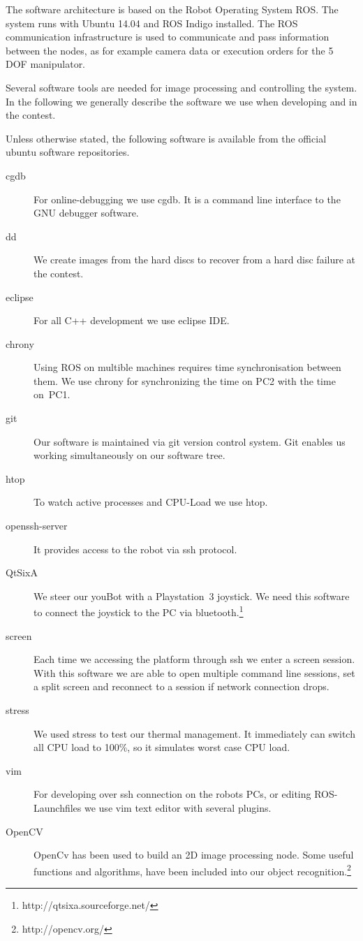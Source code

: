 The software architecture is based on the Robot Operating System ROS. The system runs with Ubuntu 14.04 and ROS Indigo installed. The ROS communication infrastructure is used to communicate and pass information between the nodes, as for example camera data or execution orders for the 5 DOF manipulator. 

Several software tools are needed for image processing and controlling the system. In the following we generally describe the software we use when developing and in the contest.

Unless otherwise stated, the following software is available from the official ubuntu software repositories.

\begin{description}
	\item [cgdb] For online-debugging we use cgdb. It is a command line interface to the GNU debugger software. 
	\item [dd] We create images from the hard discs to recover from a hard disc failure at the contest.
	\item [eclipse] For all C++ development we use eclipse IDE. 
	\item [chrony] Using ROS on multible machines requires time synchronisation between them. We use chrony for synchronizing the time on PC2 with the time on~PC1.
	\item [git] Our software is maintained via git version  control system. Git enables us working simultaneously on our software tree.  
	\item [htop] To watch active processes and CPU-Load we use htop. 
	\item [openssh-server] It provides access to the robot via ssh protocol. 
	\item [QtSixA] We steer our youBot with a Playstation~3 joystick. We need this software to connect the joystick to the PC via bluetooth.\footnote{http://qtsixa.sourceforge.net/}
	\item  [screen] Each time we accessing the platform through ssh we enter a screen session. With this software we are able to open multiple command line sessions, set a split screen and reconnect to a session if network connection drops. 
	\item [stress] We used stress to test our thermal management. It immediately can switch all CPU load to 100\%, so it simulates worst case CPU load. 
	\item [vim] For developing over ssh connection on the robots PCs, or editing ROS-Launchfiles we use vim text editor with several plugins.
	\item [OpenCV] OpenCv has been used to build an 2D image processing node. Some useful functions and algorithms, have been included into our object recognition.\footnote{http://opencv.org/}
\end{description}

